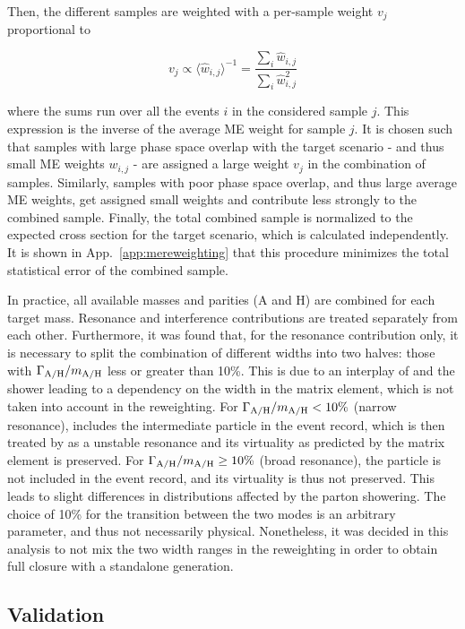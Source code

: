 Then, the different samples are weighted with a per-sample weight $v_j$ proportional to

\begin{equation}
\label{eq:ah:sampleweights}
    v_j \propto {\langle \hat{w}_{i,j} \rangle}^{-1} =  \frac{ \sum_i \hat{w}_{i,j} }{ \sum_i \hat{w}_{i,j}^2 }
\end{equation}

\noindent where the sums run over all the events $i$ in the considered sample $j$. This expression is the inverse of the average ME weight for sample $j$. It is chosen such that samples with large phase space overlap with the target \AH scenario - and thus small ME weights $w_{i,j}$ - are assigned a large weight $v_j$ in the combination of samples. Similarly, samples with poor phase space overlap, and thus large average ME weights, get assigned small weights and contribute less strongly to the combined sample. Finally, the total combined sample is normalized to the expected cross section for the target scenario, which is calculated independently. It is shown in App.~\ref{app:mereweighting} that this procedure minimizes the total statistical error of the combined sample.

In practice, all available masses and parities (A and H) are combined for each target \AH mass. Resonance and interference contributions are treated separately from each other. Furthermore, it was found that, for the resonance contribution only, it is necessary to split the combination of different \AH widths into two halves: those with $\Gamma_{\mathrm{A/H}}/m_{\mathrm{A/H}}$ less or greater than 10\%. This is due to an interplay of \amcatnlo and the \pythia shower leading to a dependency on the \AH width in the matrix element, which is not taken into account in the reweighting. For $\Gamma_{\mathrm{A/H}}/m_{\mathrm{A/H}} < 10\%$ (narrow resonance), \amcatnlo includes the intermediate \AH particle in the event record, which is then treated by \pythia as a unstable resonance and its virtuality as predicted by the matrix element is preserved. For $\Gamma_{\mathrm{A/H}}/m_{\mathrm{A/H}} \geq 10\%$ (broad resonance), the \AH particle is not included in the event record, and its virtuality is thus not preserved. This leads to slight differences in distributions affected by the parton showering. The choice of 10\% for the transition between the two modes is an arbitrary parameter, and thus not necessarily physical. Nonetheless, it was decided in this analysis to not mix the two width ranges in the reweighting in order to obtain full closure with a standalone generation.

\subsection{Validation}

